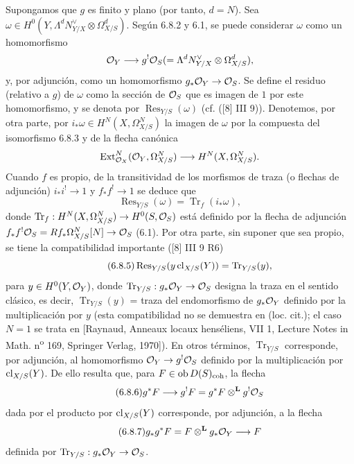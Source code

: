 Supongamos que $g$ es finito y plano (por tanto, $d=N$). Sea $\omega\in H^0(Y,\Lambda^d N_{Y/X}^{\vee}\otimes\Omega^d_{X/S})$. Según 6.8.2 y 6.1, se puede considerar $\omega$ como un homomorfismo
\[
\mathcal{O}_Y\longrightarrow g^!\mathcal{O}_S(=\Lambda^d N_{Y/X}^{\vee}\otimes\Omega^d_{X/S}),
\]
y, por adjunción, como un homomorfismo $g_*\mathcal{O}_Y\to\mathcal{O}_S$. Se define el residuo (relativo a $g$) de $\omega$ como la sección de $\mathcal{O}_S$ que es imagen de $1$ por este homomorfismo, y se denota por $\operatorname{Res}_{Y/S}(\omega)$ (cf. ([8] III 9)). Denotemos, por otra parte, por $i_*\omega\in H^N(X,\Omega^N_{X/S})$ la imagen de $\omega$ por la compuesta del isomorfismo 6.8.3 y de la flecha canónica
\[
\operatorname{Ext}^N_{\mathcal{O}_X}(\mathcal{O}_Y,\Omega^N_{X/S})\longrightarrow H^N(X,\Omega^N_{X/S}).
\]
Cuando $f$ es propio, de la transitividad de los morfismos de traza (o flechas de adjunción) $i_*i^!\to 1$ y $f_*f^!\to 1$ se deduce que
\begin{equation}
\tag{6.8.4}
\operatorname{Res}_{Y/S}(\omega)=\operatorname{Tr}_f(i_*\omega),
\end{equation}
donde $\operatorname{Tr}_f:H^N(X,\Omega^N_{X/S})\to H^0(S,\mathcal{O}_S)$ está definido por la flecha de adjunción $f_*f^!\mathcal{O}_S=Rf_*\Omega^N_{X/S}[N]\to\mathcal{O}_S$ (6.1). Por otra parte, sin suponer que sea propio, se tiene la compatibilidad importante ([8] III 9 R6)
\begin{equation}
\tag{6.8.5}
\operatorname{Res}_{Y/S}(y\operatorname{cl}_{X/S}(Y))=\operatorname{Tr}_{Y/S}(y),
\end{equation}
para $y\in H^0(Y,\mathcal{O}_Y)$, donde $\operatorname{Tr}_{Y/S}:g_*\mathcal{O}_Y\to\mathcal{O}_S$ designa la traza en el sentido clásico, es decir, $\operatorname{Tr}_{Y/S}(y)$ = traza del endomorfismo de $g_*\mathcal{O}_Y$ definido por la multiplicación por $y$ (esta compatibilidad no se demuestra en (loc. cit.); el caso $N=1$ se trata en [Raynaud, Anneaux locaux henséliens, VII 1, Lecture Notes in Math. n\textsuperscript{o} 169, Springer Verlag, 1970]). En otros términos, $\operatorname{Tr}_{Y/S}$ corresponde, por adjunción, al homomorfismo $\mathcal{O}_Y\to g^!\mathcal{O}_S$ definido por la multiplicación por $\operatorname{cl}_{X/S}(Y)$. De ello resulta que, para $F\in\operatorname{ob} D(S)_{\mathrm{coh}}$, la flecha
\begin{equation}
\tag{6.8.6}
g^*F\longrightarrow g^!F=g^*F\otimes^{\mathbf L}g^!\mathcal{O}_S
\end{equation}
dada por el producto por $\operatorname{cl}_{X/S}(Y)$ corresponde, por adjunción, a la flecha
\begin{equation}
\tag{6.8.7}
g_*g^*F=F\otimes^{\mathbf L}g_*\mathcal{O}_Y\longrightarrow F
\end{equation}
definida por $\operatorname{Tr}_{Y/S}:g_*\mathcal{O}_Y\to\mathcal{O}_S$.

